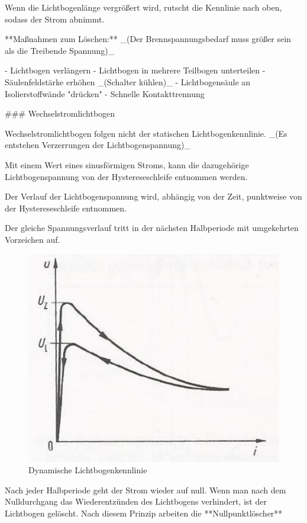 \begin{markdown}
Wenn die Lichtbogenlänge vergrößert wird, rutscht die Kennlinie nach oben, sodass der Strom abnimmt.

**Maßnahmen zum Löschen:** _(Der Brennspannungsbedarf muss größer sein als die Treibende Spannung)_

- Lichtbogen verlängern
- Lichtbogen in mehrere Teilbogen unterteilen
- Säulenfeldstärke erhöhen _(Schalter kühlen)_
- Lichtbogensäule an Isolierstoffwände "drücken"
- Schnelle Kontakttrennung 

\newpage

### Wechselstromlichtbogen

Wechselstromlichtbogen folgen nicht der statischen Lichtbogenkennlinie. _(Es entstehen Verzerrungen der Lichtbogenspannung)_

Mit einem Wert eines sinusförmigen Stroms, kann die dazugehörige Lichtbogenspannung von der Hystereseschleife entnommen werden.

Der Verlauf der Lichtbogenspannung wird, abhängig von der Zeit, punktweise von der Hystereseschleife entnommen. 

Der gleiche Spannungsverlauf tritt in der nächsten Halbperiode mit umgekehrten Vorzeichen auf.

\begin{figure}
    \centering
    \includegraphics[width=0.8\linewidth]{./images/10-Schaltanlagen/Lichtbogenkennlinie-Dynamisch.png}
    \caption[Dynamische Lichtbogenkennlinie]{Dynamische Lichtbogenkennlinie}
\end{figure}

Nach jeder Halbperiode geht der Strom wieder auf null. Wenn man nach dem Nulldurchgang das Wiederentzünden des Lichtbogens verhindert, ist der Lichtbogen gelöscht. Nach diesem Prinzip arbeiten die **Nullpunktlöscher**


\end{markdown}
